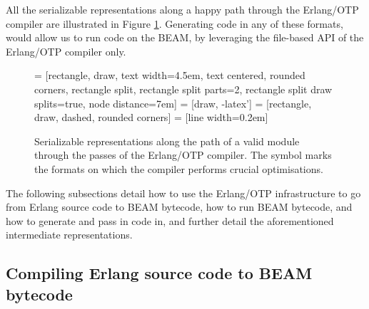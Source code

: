 All the serializable representations along a happy path through the
Erlang/OTP compiler are illustrated in Figure
\ref{fig:serializable-representations}. Generating code in any of
these formats, would allow us to run code on the BEAM, by leveraging
the file-based API of the Erlang/OTP compiler only. 

\NewDocumentCommand\optimising{}{$\circlearrowright$}

\begin{figure}[ht!]
\centering
{} = [rectangle, draw, 
    text width=4.5em, text centered, rounded corners,
    rectangle split, rectangle split parts=2,
    rectangle split draw splits=true,
    node distance=7em]
 = [draw, -latex']
 = [rectangle, draw, dashed, rounded corners]
 = [line width=0.2em]


\caption{Serializable representations along the path of a valid module
through the passes of the Erlang/OTP compiler. The symbol
\optimising{} marks the formats on which the compiler performs crucial
optimisations.}

\label{fig:serializable-representations}
\end{figure}

The following subsections detail how to use the Erlang/OTP
infrastructure to go from Erlang source code to BEAM bytecode, how to
run BEAM bytecode, and how to generate and pass in code in, and
further detail the aforementioned intermediate representations.

\subsection{Compiling Erlang source code to BEAM bytecode}

